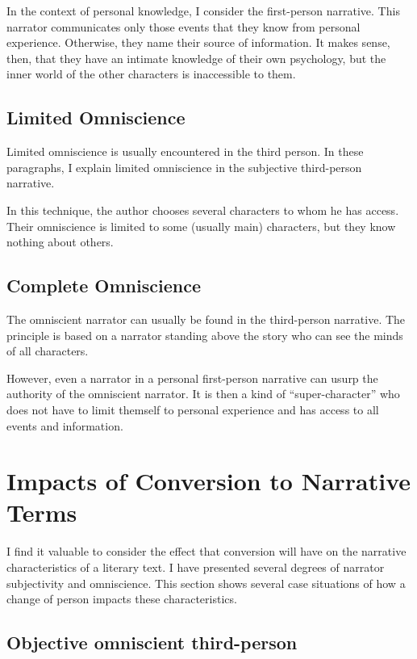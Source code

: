 In the context of personal knowledge, I consider the first-person narrative. This narrator communicates only those events that they know from personal experience. Otherwise, they name their source of information. It makes sense, then, that they have an intimate knowledge of their own psychology, but the inner world of the other characters is inaccessible to them. \cite{dolezel-narativni-zpusoby}

\subsection{Limited Omniscience}

Limited omniscience is usually encountered in the third person. In these paragraphs, I explain limited omniscience in the subjective third-person narrative.

In this technique, the author chooses several characters to whom he has access. Their omniscience is limited to some (usually main) characters, but they know nothing about others. \cite{docekalova}

\subsection{Complete Omniscience}

The omniscient narrator can usually be found in the third-person narrative. The principle is based on a narrator standing above the story who can see the minds of all characters. \cite{docekalova}

However, even a narrator in a personal first-person narrative can usurp the authority of the omniscient narrator. It is then a kind of ``super-character'' who does not have to limit themself to personal experience and has access to all events and information. \cite{dolezel-narativni-zpusoby}


\section{Impacts of Conversion to Narrative Terms}

I find it valuable to consider the effect that conversion will have on the narrative characteristics of a literary text. I have presented several degrees of narrator subjectivity and omniscience. This section shows several case situations of how a change of person impacts these characteristics.

\subsection*{Objective omniscient third-person}

